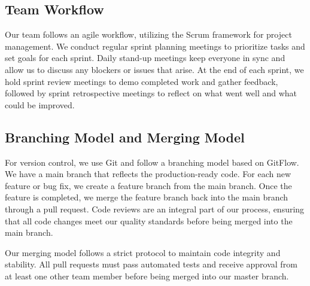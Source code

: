 \subsection{Team Workflow}\label{team_workflow}
Our team follows an agile workflow, utilizing the Scrum framework for project management. We conduct regular sprint planning meetings to prioritize tasks and set goals for each sprint. Daily stand-up meetings keep everyone in sync and allow us to discuss any blockers or issues that arise. At the end of each sprint, we hold sprint review meetings to demo completed work and gather feedback, followed by sprint retrospective meetings to reflect on what went well and what could be improved.

\subsection{Branching Model and Merging Model}\label{bm_mm}
For version control, we use Git and follow a branching model based on GitFlow. We have a main branch that reflects the production-ready code. For each new feature or bug fix, we create a feature branch from the main branch. Once the feature is completed, we merge the feature branch back into the main branch through a pull request. Code reviews are an integral part of our process, ensuring that all code changes meet our quality standards before being merged into the main branch.

Our merging model follows a strict protocol to maintain code integrity and stability. All pull requests must pass automated tests and receive approval from at least one other team member before being merged into our master branch.
